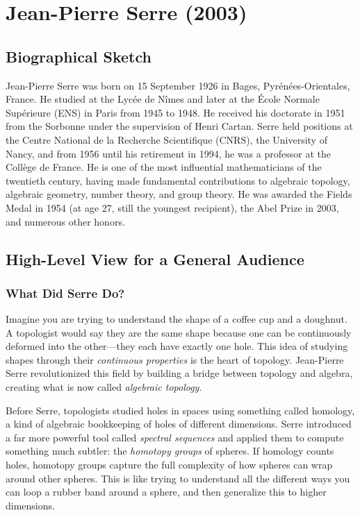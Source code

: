 \chapter{Jean-Pierre Serre (2003)}

\section{Biographical Sketch}



Jean-Pierre Serre was born on 15 September 1926 in Bages, Pyrénées-Orientales, France. He studied at the Lycée de Nîmes and later at the École Normale Supérieure (ENS) in Paris from 1945 to 1948. He received his doctorate in 1951 from the Sorbonne under the supervision of Henri Cartan. Serre held positions at the Centre National de la Recherche Scientifique (CNRS), the University of Nancy, and from 1956 until his retirement in 1994, he was a professor at the Collège de France. He is one of the most influential mathematicians of the twentieth century, having made fundamental contributions to algebraic topology, algebraic geometry, number theory, and group theory. He was awarded the Fields Medal in 1954 (at age 27, still the youngest recipient), the Abel Prize in 2003, and numerous other honors.

\section{High-Level View for a General Audience}

\subsection{What Did Serre Do?}

Imagine you are trying to understand the shape of a coffee cup and a doughnut. A topologist would say they are the same shape because one can be continuously deformed into the other---they each have exactly one hole. This idea of studying shapes through their \emph{continuous properties} is the heart of topology. Jean-Pierre Serre revolutionized this field by building a bridge between topology and algebra, creating what is now called \emph{algebraic topology}.

Before Serre, topologists studied holes in spaces using something called homology, a kind of algebraic bookkeeping of holes of different dimensions. Serre introduced a far more powerful tool called \emph{spectral sequences} and applied them to compute something much subtler: the \emph{homotopy groups} of spheres. If homology counts holes, homotopy groups capture the full complexity of how spheres can wrap around other spheres. This is like trying to understand all the different ways you can loop a rubber band around a sphere, and then generalize this to higher dimensions.


